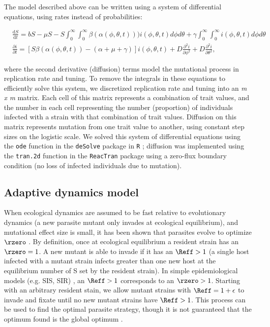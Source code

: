 The model described above can be written using a system of differential equations, using rates instead of probabilities:

\begin{align*}
& \frac{\mathrm{d} S}{\mathrm{d} t} = bS - \mu S - S \int_{0}^{\infty}  \int_{0}^{\infty} \beta(\alpha(\phi, \theta, t)))i(\phi, \theta, t)d\phi d\theta + \gamma \int_{0}^{\infty}  \int_{0}^{\infty} i(\phi, \theta, t)d\phi d\theta \\ 
& \frac{\partial i}{\partial t} = [S\beta(\alpha(\phi, \theta, t)) - (\alpha + \mu + \gamma)]i(\phi, \theta, t) + D\frac{\partial^2 i}{\partial \phi^2} + D\frac{\partial^2 i}{\partial \theta^2},
\end{align*}

\noindent where the second derivative (diffusion) terms model the mutational process in replication rate and tuning. To remove the integrals in these equations to efficiently solve this system, we discretized replication rate and tuning into an \emph{m x m} matrix. Each cell of this matrix represents a combination of trait values, and the number in each cell representing the number (proportion) of individuals infected with a strain with that combination of trait values. Diffusion on this matrix represents mutation from one trait value to another, using constant step sizes on the logistic scale. We solved this system of differential equations using the {\tt ode} function in the {\tt deSolve} package \citep{Soetaertetal.2010} in {\tt R} \citep{Rcoreteam}; diffusion was implemented using the {\tt tran.2d} function in the {\tt ReacTran} \citep{SoetaertandMeysman2012} package using a zero-flux boundary condition (no loss of infected individuals due to mutation). 

\subsection*{Adaptive dynamics model}

When ecological dynamics are assumed to be fast relative to evolutionary dynamics (a new parasite mutant only invades at ecological equilibrium), and mutational effect size is small, it has been shown that parasites evolve to optimize $\rzero$ \citep{Dieckmann2002, KeelingandRohani2008, Lion2018}. By definition, once at ecological equilibrium a resident strain has an $\rzero = 1$. A new mutant is able to invade if it has an $\Reff > 1$ (a single host infected with a mutant strain infects greater than one new host at the equilibrium number of S set by the resident strain). In simple epidemiological models (e.g. SIS, SIR) \citep{Dieckmann2002, KeelingandRohani2008, Lion2018}, an $\Reff > 1$ corresponds to an $\rzero > 1$. Starting with an arbitrary resident stain, we allow mutant strains with $\Reff = 1 + \epsilon$ to invade and fixate until no new mutant strains have $\Reff > 1$. This process can be used to find the optimal parasite strategy, though it is not guaranteed that the optimum found is the global optimum \citep{Dieckmann2002}.

